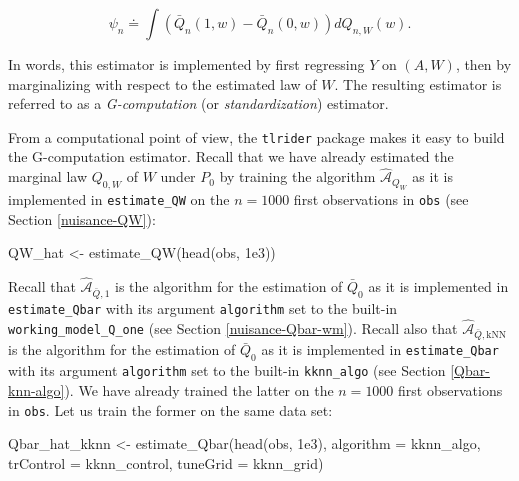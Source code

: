 \documentclass[
  11pt,
  openright,twoside]{book}
\newenvironment{Shaded}{\begin{snugshade}}{\end{snugshade}}
\newcommand{\AttributeTok}[1]{\textcolor[rgb]{0.77,0.63,0.00}{#1}}
\newcommand{\FloatTok}[1]{\textcolor[rgb]{0.00,0.00,0.81}{#1}}
\newcommand{\FunctionTok}[1]{\textcolor[rgb]{0.00,0.00,0.00}{#1}}
\newcommand{\NormalTok}[1]{#1}
\newcommand{\OtherTok}[1]{\textcolor[rgb]{0.56,0.35,0.01}{#1}}
\newcommand{\Algo}{\widehat{\mathcal{A}}}
\newcommand{\defq}{\doteq}
\newcommand{\Qbar}{\bar{Q}}
\theoremstyle{definition}
\theoremstyle{definition}
\theoremstyle{definition}
\theoremstyle{definition}
\theoremstyle{remark}
\begin{document}
\begin{equation} 
\psi_{n}   \defq   \int   \left(\Qbar_{n}(1,   w)   -   \Qbar_{n}(0,w)\right)
dQ_{n,W}(w). \label{eq:Gcomp-estimator}
\end{equation}

In words, this estimator is implemented by first regressing \(Y\) on \((A,W)\),
then by marginalizing with respect to the estimated law of \(W\). The resulting
estimator is referred to as a \emph{G-computation} (or \emph{standardization})
estimator.

From a computational point of view, the \texttt{tlrider} package makes it easy to
build the G-computation estimator. Recall that we have already estimated the
marginal law \(Q_{0,W}\) of \(W\) under \(P_{0}\) by training the algorithm
\(\Algo_{Q_{W}}\) as it is implemented in \texttt{estimate\_QW} on the \(n = 1000\) first
observations in \texttt{obs} (see Section \ref{nuisance-QW}):

\begin{Shaded}
\begin{Highlighting}[]
\NormalTok{QW\_hat }\OtherTok{\textless{}{-}} \FunctionTok{estimate\_QW}\NormalTok{(}\FunctionTok{head}\NormalTok{(obs, }\FloatTok{1e3}\NormalTok{))}
\end{Highlighting}
\end{Shaded}

Recall that \(\Algo_{\Qbar,1}\) is the algorithm for the estimation of
\(\Qbar_{0}\) as it is implemented in \texttt{estimate\_Qbar} with its argument
\texttt{algorithm} set to the built-in \texttt{working\_model\_Q\_one} (see Section
\ref{nuisance-Qbar-wm}). Recall also that \(\Algo_{\Qbar,\text{kNN}}\) is the
algorithm for the estimation of \(\Qbar_{0}\) as it is implemented in
\texttt{estimate\_Qbar} with its argument \texttt{algorithm} set to the built-in \texttt{kknn\_algo}
(see Section \ref{Qbar-knn-algo}). We have already trained the latter on the
\(n=1000\) first observations in \texttt{obs}. Let us train the former on the same data
set:

\begin{Shaded}
\begin{Highlighting}[]
\NormalTok{Qbar\_hat\_kknn }\OtherTok{\textless{}{-}} \FunctionTok{estimate\_Qbar}\NormalTok{(}\FunctionTok{head}\NormalTok{(obs, }\FloatTok{1e3}\NormalTok{),}
                               \AttributeTok{algorithm =}\NormalTok{ kknn\_algo,}
                               \AttributeTok{trControl =}\NormalTok{ kknn\_control,}
                               \AttributeTok{tuneGrid =}\NormalTok{ kknn\_grid)}
\end{Highlighting}
\end{Shaded}
\end{document}

